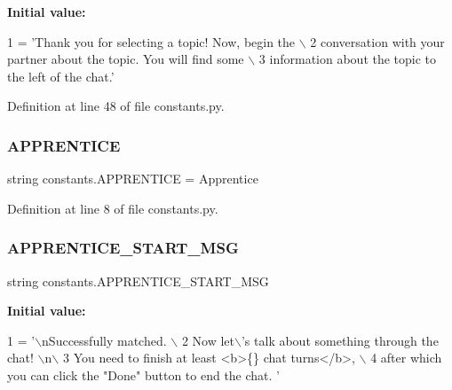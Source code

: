 {\bfseries Initial value\+:}
\begin{DoxyCode}
1 =  \textcolor{stringliteral}{'Thank you for selecting a topic! Now, begin the \(\backslash\)}
2 \textcolor{stringliteral}{        conversation with your partner about the topic. You will find some \(\backslash\)}
3 \textcolor{stringliteral}{        information about the topic to the left of the chat.'}
\end{DoxyCode}


Definition at line 48 of file constants.\+py.

\mbox{\label{namespaceconstants_a9eeb0aa045e07c36ec81a10684aee2e0}} 
\subsubsection{\texorpdfstring{A\+P\+P\+R\+E\+N\+T\+I\+CE}{APPRENTICE}}
{\footnotesize\ttfamily string constants.\+A\+P\+P\+R\+E\+N\+T\+I\+CE = \textquotesingle{}Apprentice\textquotesingle{}}



Definition at line 8 of file constants.\+py.

\mbox{\label{namespaceconstants_aad1b4fee717300129af05f9bc7edac13}} 
\subsubsection{\texorpdfstring{A\+P\+P\+R\+E\+N\+T\+I\+C\+E\+\_\+\+S\+T\+A\+R\+T\+\_\+\+M\+SG}{APPRENTICE\_START\_MSG}}
{\footnotesize\ttfamily string constants.\+A\+P\+P\+R\+E\+N\+T\+I\+C\+E\+\_\+\+S\+T\+A\+R\+T\+\_\+\+M\+SG}

{\bfseries Initial value\+:}
\begin{DoxyCode}
1 =  \textcolor{stringliteral}{'\(\backslash\)nSuccessfully matched. \(\backslash\)}
2 \textcolor{stringliteral}{        Now let\(\backslash\)'s talk about something through the chat! \(\backslash\)n\(\backslash\)}
3 \textcolor{stringliteral}{        You need to finish at least <b>\{\} chat turns</b>, \(\backslash\)}
4 \textcolor{stringliteral}{        after which you can click the "Done" button to end the chat. '}
\end{DoxyCode}


